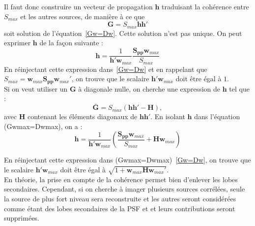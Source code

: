 Il faut donc construire un vecteur de propagation $\bm{h}$ traduisant la cohérence entre $S_{max}$ et les autres sources, de manière à ce que 
\begin{equation}
	\bm{G} = S_{max} \bm{hh}'
\end{equation}
soit solution de l'équation~\ref{Gw=Dw}.
Cette solution n'est pas unique. On peut exprimer $\bm{h}$ de la façon suivante : 
\begin{equation}
	\bm{h}=\frac{1}{\bm{h}'\bm{w}_{max}}  \frac{\bm{S_{pp}}\bm{w}_{max}}{S_{max}}
\end{equation}
En réinjectant cette expression dans~\ref{Gw=Dw} et en rappelant que $S_{max} = \bm{w}_{max}\bm{S_{pp}}\bm{w}_{max}'$, on trouve que le scalaire $\bm{h}'\bm{w}_{max}$ doit être égal à $1$.\\

Si on veut utiliser un $\bm{G}$ à diagonale nulle, on cherche une expression de $\bm{h}$ tel que : 
\begin{equation}
	\bar{\bm{G}} = S_{max} (\bm{hh}'-\bm{H}),
\end{equation}
avec $\bm{H}$ contenant les éléments diagonaux de $\bm{hh}'$. En isolant $\bm{h}$ dans l'équation (Gwmax=Dwmax), on a : 
\begin{equation}
	\bm{h}=\frac{1}{\bm{h}'\bm{w}_{max}}  \left( \frac{\bm{S_{pp}}\bm{w}_{max}}{S_{max}} + \bm{H}\bm{w}_{max} \right)
\end{equation}

En réinjectant cette expression dans (Gwmax=Dwmax)~\ref{Gw=Dw}, on trouve que le scalaire $\bm{h}'\bm{w}_{max}$ doit être égal à $\sqrt{1+\bm{w}_{max}\bm{H}\bm{w}_{max}'}$.\\

En théorie, la prise en compte de la cohérence permet bien d'enlever les lobes secondaires. Cependant, si on cherche à imager plusieurs sources corrélées, seule la source de plus fort niveau sera reconstruite et les autres seront considérées comme étant des lobes secondaires de la PSF et et leurs contributions seront supprimées.
 







